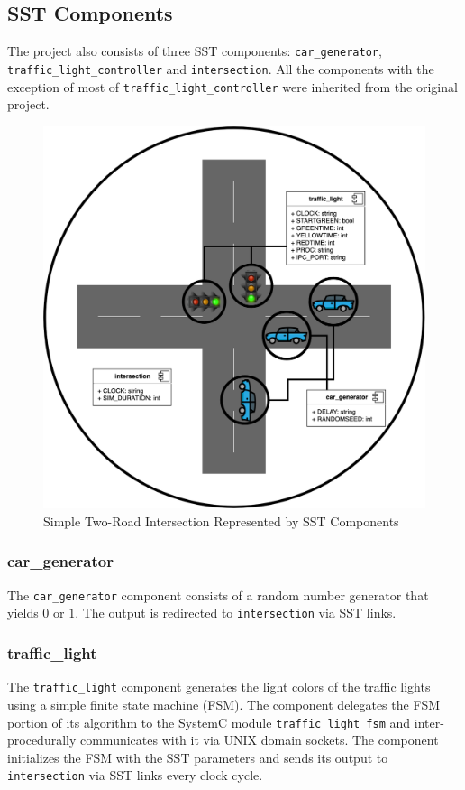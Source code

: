 \documentclass{article}
\begin{document}
    \subsection{SST Components}
    The project also consists of three SST components: \lstinline{car_generator},
    \lstinline{traffic_light_controller} and \lstinline{intersection}. All the components with the
    exception of most of \lstinline{traffic_light_controller} were inherited from the original
    project.

      \begin{figure}[!h]
        \centering
        \includegraphics[width=4.5in]{diagrams/intersection_comp.png}
        \caption{Simple Two-Road Intersection Represented by SST Components}
        \label{fig:intersection_comp}
      \end{figure}

      \subsubsection{car\_generator}
      The \lstinline{car_generator} component consists of a random number generator that yields $0$
      or $1$. The output is redirected to \lstinline{intersection} via SST links.

      \subsubsection{traffic\_light}
      The \lstinline{traffic_light} component generates the light colors of the traffic lights using
      a simple finite state machine (FSM). The component delegates the FSM portion of its algorithm
      to the SystemC module \lstinline{traffic_light_fsm} and inter-procedurally communicates with
      it via UNIX domain sockets. The component initializes the FSM with the SST parameters and
      sends its output to \lstinline{intersection} via SST links every clock cycle.
\end{document}
